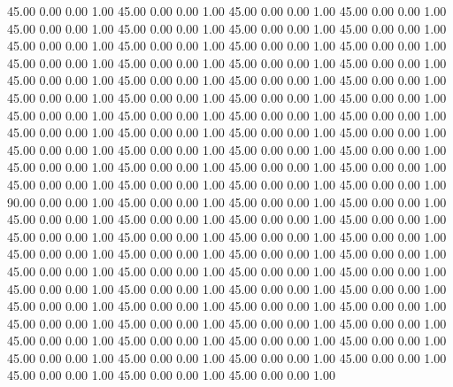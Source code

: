    45.00   0.00   0.00   1.00
   45.00   0.00   0.00   1.00
   45.00   0.00   0.00   1.00
   45.00   0.00   0.00   1.00
   45.00   0.00   0.00   1.00
   45.00   0.00   0.00   1.00
   45.00   0.00   0.00   1.00
   45.00   0.00   0.00   1.00
   45.00   0.00   0.00   1.00
   45.00   0.00   0.00   1.00
   45.00   0.00   0.00   1.00
   45.00   0.00   0.00   1.00
   45.00   0.00   0.00   1.00
   45.00   0.00   0.00   1.00
   45.00   0.00   0.00   1.00
   45.00   0.00   0.00   1.00
   45.00   0.00   0.00   1.00
   45.00   0.00   0.00   1.00
   45.00   0.00   0.00   1.00
   45.00   0.00   0.00   1.00
   45.00   0.00   0.00   1.00
   45.00   0.00   0.00   1.00
   45.00   0.00   0.00   1.00
   45.00   0.00   0.00   1.00
   45.00   0.00   0.00   1.00
   45.00   0.00   0.00   1.00
   45.00   0.00   0.00   1.00
   45.00   0.00   0.00   1.00
   45.00   0.00   0.00   1.00
   45.00   0.00   0.00   1.00
   45.00   0.00   0.00   1.00
   45.00   0.00   0.00   1.00
   45.00   0.00   0.00   1.00
   45.00   0.00   0.00   1.00
   45.00   0.00   0.00   1.00
   45.00   0.00   0.00   1.00
   45.00   0.00   0.00   1.00
   45.00   0.00   0.00   1.00
   45.00   0.00   0.00   1.00
   45.00   0.00   0.00   1.00
   45.00   0.00   0.00   1.00
   45.00   0.00   0.00   1.00
   45.00   0.00   0.00   1.00
   45.00   0.00   0.00   1.00
   90.00   0.00   0.00   1.00
   45.00   0.00   0.00   1.00
   45.00   0.00   0.00   1.00
   45.00   0.00   0.00   1.00
   45.00   0.00   0.00   1.00
   45.00   0.00   0.00   1.00
   45.00   0.00   0.00   1.00
   45.00   0.00   0.00   1.00
   45.00   0.00   0.00   1.00
   45.00   0.00   0.00   1.00
   45.00   0.00   0.00   1.00
   45.00   0.00   0.00   1.00
   45.00   0.00   0.00   1.00
   45.00   0.00   0.00   1.00
   45.00   0.00   0.00   1.00
   45.00   0.00   0.00   1.00
   45.00   0.00   0.00   1.00
   45.00   0.00   0.00   1.00
   45.00   0.00   0.00   1.00
   45.00   0.00   0.00   1.00
   45.00   0.00   0.00   1.00
   45.00   0.00   0.00   1.00
   45.00   0.00   0.00   1.00
   45.00   0.00   0.00   1.00
   45.00   0.00   0.00   1.00
   45.00   0.00   0.00   1.00
   45.00   0.00   0.00   1.00
   45.00   0.00   0.00   1.00
   45.00   0.00   0.00   1.00
   45.00   0.00   0.00   1.00
   45.00   0.00   0.00   1.00
   45.00   0.00   0.00   1.00
   45.00   0.00   0.00   1.00
   45.00   0.00   0.00   1.00
   45.00   0.00   0.00   1.00
   45.00   0.00   0.00   1.00
   45.00   0.00   0.00   1.00
   45.00   0.00   0.00   1.00
   45.00   0.00   0.00   1.00
   45.00   0.00   0.00   1.00
   45.00   0.00   0.00   1.00
   45.00   0.00   0.00   1.00
   45.00   0.00   0.00   1.00

